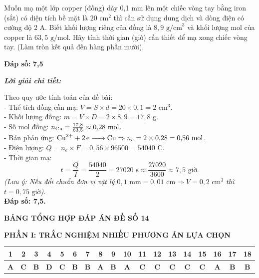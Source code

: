 \documentclass[11pt,a4paper]{article}
\def\loigiai#1{
\par\begingroup\color{blue!80!black}\small
\noindent\textbf{\textit{Lời giải chi tiết:}}\par
#1\par\endgroup}
\begin{document}
\begin{ex}
Muốn mạ một lớp copper (đồng) dày 0,1 mm lên một chiếc vòng tay bằng iron (sắt) có diện tích bề mặt là $20\text{ cm}^2$ thì cần sử dụng dung dịch  và dòng điện có cường độ 2 A. Biết khối lượng riêng của đồng là $8{,}9\text{ g/cm}^3$ và khối lượng mol của copper là $63{,}5\text{ g/mol}$. Hãy tính thời gian (giờ) cần thiết để mạ xong chiếc vòng tay. (Làm tròn kết quả đến hàng phần mười).
\par\noindent\textbf{Đáp số:} \textbf{\color{red}7,5}
\loigiai{
Theo quy ước tính toán của đề bài:\\
- Thể tích đồng cần mạ: $V = S \times d = 20 \times 0{,}1 = 2\text{ cm}^3$.\\
- Khối lượng đồng: $m = V \times D = 2 \times 8{,}9 = 17{,}8\text{ g}$.\\
- Số mol đồng: $n_{\ce{Cu}} = \frac{17{,}8}{63{,}5} \approx 0{,}28\text{ mol}$.\\
- Bán phản ứng: $\ce{Cu^2+ + 2e -> Cu} \Rightarrow n_e = 2 \times 0{,}28 = 0{,}56\text{ mol}$.\\
- Điện lượng: $Q = n_e \times F = 0{,}56 \times 96500 = 54040\text{ C}$.\\
- Thời gian mạ:
$$t = \frac{Q}{I} = \frac{54040}{2} = 27020\text{ s} \approx \frac{27020}{3600} \approx 7{,}5\text{ giờ.}$$
\textit{(Lưu ý: Nếu đổi chuẩn đơn vị vật lý $0{,}1\text{ mm} = 0{,}01\text{ cm} \Rightarrow V = 0{,}2\text{ cm}^3$ thì $t = 0{,}75\text{ giờ}$).}\\
\textbf{Đáp số: 7,5.}}
\end{ex}



\vspace{0.5cm}
\begin{center}
	\textbf{\Large\color{mainGreen}BẢNG TỔNG HỢP ĐÁP ÁN ĐỀ SỐ 14}
\end{center}

\vspace{0.2cm}
\noindent\textbf{\color{mainGreen}PHẦN I: TRẮC NGHIỆM NHIỀU PHƯƠNG ÁN LỰA CHỌN}
\begin{center}
\renewcommand{\arraystretch}{1.2}
\begin{tabular}{|c|c|c|c|c|c|c|c|c|c|c|c|c|c|c|c|c|c|}
\hline
\textbf{1} & \textbf{2} & \textbf{3} & \textbf{4} & \textbf{5} & \textbf{6} & \textbf{7} & \textbf{8} & \textbf{9} & \textbf{10} & \textbf{11} & \textbf{12} & \textbf{13} & \textbf{14} & \textbf{15} & \textbf{16} & \textbf{17} & \textbf{18} \\ \hline
\textbf{\color{red}A} & \textbf{\color{red}C} & \textbf{\color{red}B} & \textbf{\color{red}D} & \textbf{\color{red}C} & \textbf{\color{red}B} & \textbf{\color{red}B} & \textbf{\color{red}A} & \textbf{\color{red}B} & \textbf{\color{red}A} & \textbf{\color{red}C} & \textbf{\color{red}C} & \textbf{\color{red}C} & \textbf{\color{red}C} & \textbf{\color{red}C} & \textbf{\color{red}A} & \textbf{\color{red}B} & \textbf{\color{red}B} \\ \hline
\end{tabular}
\end{center}
\end{document}
